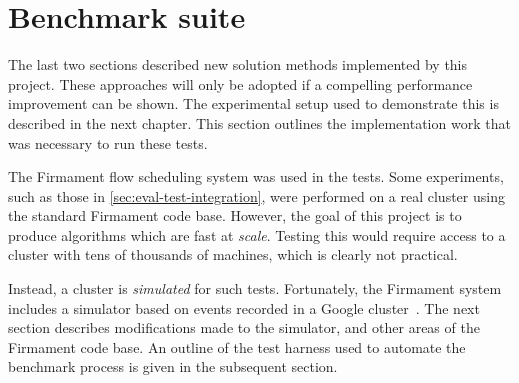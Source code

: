\section{Benchmark suite} \label{sec:impl-benchmark}



The last two sections described new solution methods implemented by this project. These approaches will only be adopted if a compelling performance improvement can be shown. The experimental setup used to demonstrate this is described in the next chapter. This section outlines the implementation work that was necessary to run these tests.

The Firmament flow scheduling system was used in the tests. Some experiments, such as those in \cref{sec:eval-test-integration}, were performed on a real cluster using the standard Firmament code base. However, the goal of this project is to produce algorithms which are fast at \emph{scale}. Testing this would require access to a cluster with tens of thousands of machines, which is clearly not practical.

Instead, a cluster is \emph{simulated} for such tests. Fortunately, the Firmament system includes a simulator based on events recorded in a Google cluster~\cite{clusterdata:Wilkes2011}. The next section describes modifications made to the simulator, and other areas of the Firmament code base. An outline of the test harness used to automate the benchmark process is given in the subsequent section.

